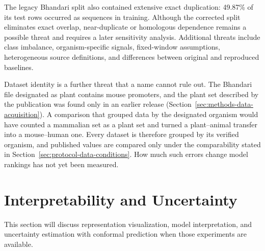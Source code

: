 The legacy Bhandari split also contained extensive exact duplication: 49.87\%
of its test rows occurred as sequences in training. Although the corrected split
eliminates exact overlap, near-duplicate or homologous dependence remains a
possible threat and requires a later sensitivity analysis. Additional threats
include class imbalance, organism-specific signals, fixed-window assumptions,
heterogeneous source definitions, and differences between original and
reproduced baselines.

Dataset identity is a further threat that a name cannot rule out. The Bhandari
file designated as plant contains mouse promoters, and the plant set described
by the publication was found only in an earlier release
(Section~\ref{sec:methods-data-acquisition}). A comparison that grouped data by
the designated organism would have counted a mammalian set as a plant set and
turned a plant--animal transfer into a mouse--human one. Every dataset is
therefore grouped by its verified organism, and published values are compared
only under the comparability stated in
Section~\ref{sec:protocol-data-conditions}. How much such errors change model
rankings has not yet been measured.

\section{Interpretability and Uncertainty}\label{sec:discussion-interpretability}

This section will discuss representation visualization, model interpretation,
and uncertainty estimation with conformal prediction when those experiments are
available.
